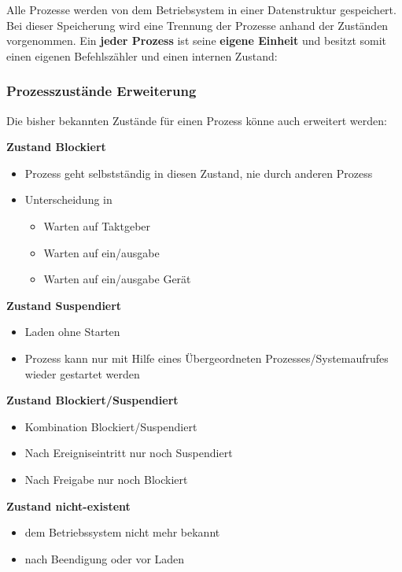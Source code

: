 \documentclass[10pt,a4paper]{article}
\begin{document}
\begin{multicols*}{4}
Alle Prozesse werden von dem Betriebsystem in einer Datenstruktur gespeichert. Bei dieser Speicherung wird eine
Trennung der Prozesse anhand der Zuständen vorgenommen. Ein \textbf{jeder Prozess} ist seine \textbf{eigene Einheit}
und besitzt somit einen eigenen Befehlszähler und einen internen Zustand:

\begin{center}
	
\end{center}

\subsubsection{Prozesszustände Erweiterung}\label{subsubsec:prozesszustände-erweiterung}

Die bisher bekannten Zustände für einen Prozess könne auch erweitert werden:

\textbf{Zustand Blockiert}\hfill
\begin{itemize}
	\item Prozess geht selbstständig in diesen Zustand, nie durch anderen Prozess
	\item Unterscheidung in
	      \begin{itemize}
		      \item Warten auf Taktgeber
		      \item Warten auf ein/ausgabe
		      \item Warten auf ein/ausgabe Gerät
	      \end{itemize}
\end{itemize}

\textbf{Zustand Suspendiert}\hfill
\begin{itemize}
	\item Laden ohne Starten
	\item Prozess kann nur mit Hilfe eines Übergeordneten Prozesses/Systemaufrufes wieder gestartet werden
\end{itemize}

\textbf{ Zustand Blockiert/Suspendiert}\hfill
\begin{itemize}
	\item Kombination Blockiert/Suspendiert
	\item Nach Ereigniseintritt nur noch Suspendiert
	\item Nach Freigabe nur noch Blockiert
\end{itemize}

\textbf{ Zustand nicht-existent}\hfill
\begin{itemize}
	\item dem Betriebssystem nicht mehr bekannt
	\item nach Beendigung oder vor Laden
\end{itemize}


\end{multicols*}
\end{document}
